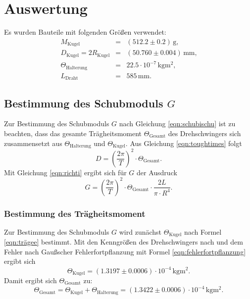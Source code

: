 \section{Auswertung}
\label{sec:Auswertung}
Es wurden Bauteile mit folgenden Größen verwendet:
\begin{equation}
	\label{eqn:bauteile}
	\begin{aligned}
		M_{\mathrm{Kugel}}                       & = & (512.2 \pm 0.2) \,\si{\gram}\text{,}                       \\
		D_{\mathrm{Kugel}} = 2R_{\mathrm{Kugel}} & = & (50.760\pm 0.004)\,\si{\milli\meter} \text{,}              \\
		\Theta_{\mathrm{Halterung}}              & = & 22.5 \cdot 10^{-7} \, \si{\kilo\gram\square\metre}\text{,} \\
		L_{\mathrm{Draht}}                       & = & 585 \,\si{\milli\meter} \text{.}
	\end{aligned}
\end{equation}
\FloatBarrier

\subsection{Bestimmung des Schubmoduls $G$}
Zur Bestimmung des Schubmoduls $G$ nach Gleichung \eqref{eqn:schubischu} ist zu beachten,
dass das gesamte Trägheitsmoment $\Theta_{\mathrm{Gesamt}}$ des Drehschwingers sich zusammensetzt aus
$\Theta_{\mathrm{Halterung}}$ und $\Theta_{\mathrm{Kugel}}$.
Aus Gleichung \eqref{eqn:toughtimes} folgt
\begin{equation*}
	\label{eqn:dattD}
	D=\left(\frac{2\pi}{T}\right)^2 \cdot \Theta_{\mathrm{Gesamt}} \mathrm{.}
\end{equation*}
Mit Gleichung \eqref{eqn:richti} ergibt sich für $G$ der Ausdruck
\begin{equation*}
	\label{eqn:richtigerG}
	G=\left(\frac{2\pi}{T}\right)^2 \cdot \Theta_{\mathrm{Gesamt}}\cdot \frac{2L}{\pi\cdot R^4} \mathrm{.}
\end{equation*}
\subsubsection{Bestimmung des Trägheitsmoment}
Zur Bestimmung des Schubmoduls $G$ wird zunächst $\Theta_{\mathrm{Kugel}}$ nach Formel \eqref{eqn:trägee} bestimmt.
Mit den Kenngrößen des Drehschwingers nach  und dem Fehler nach Gaußscher Fehlerfortpflanzung mit Formel \eqref{eqn:fehlerfortpflanzung} ergibt sich
\begin{equation*}
	\Theta_{\mathrm{Kugel}}=(1.3197\pm 0.0006) \cdot 10^{-4} \,\si{\kilo\gram \square\metre} \text{.}
\end{equation*}
Damit ergibt sich $\Theta_{\mathrm{Gesamt}}$ zu:
\begin{equation*}
	\label{eqn:trägemasse}
	\Theta_{\mathrm{Gesamt}}= \Theta_{\mathrm{Kugel}}+\Theta_{\mathrm{Halterung}}= (1.3422\pm 0.0006)
	\cdot 10^{-4} \,\si{\kilo\gram \square\metre} \text{.}
\end{equation*}
